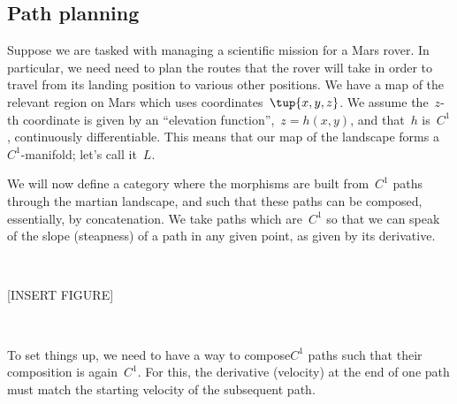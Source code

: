  
\subsection{Path planning}
\label{sec:trekking}

Suppose we are tasked with managing a scientific mission for a Mars rover. In particular, we need need to plan the routes that the rover will take in order to travel from its landing position to various other positions. We have a map of the relevant region on Mars which uses coordinates~$\tup{x, y, z}$. We assume the~$z$-th coordinate is given by an ``elevation function'',~$z = h(x,y)$, and that~$h$ is~$C^1$,  continuously differentiable. This means that our map of the landscape forms a~$C^1$-manifold; let's call it~$L$. 


We will now define a category where the morphisms are built from~$C^1$ paths through the martian landscape, and such that these paths can be composed, essentially, by concatenation. We take paths which are~$C^1$ so that we can speak of the slope (steapness) of a path in any given point, as given by its derivative. 

\

[INSERT FIGURE]

\



To set things up, we need to have a way to compose$C^1$ paths such that their composition is again~$C^1$. For this, the derivative (velocity) at the end of one path must match the starting velocity of the subsequent path.

